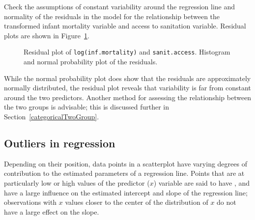 \begin{example}{Check the assumptions of constant variability around the regression line and normality of the residuals in the model for the relationship between the transformed infant mortality variable and access to sanitation variable. Residual plots are shown in Figure~\ref{wdiResid}.
		
\begin{figure}[h]
	\centering
	\caption{ Residual plot of \texttt{log(inf.mortality)} and \texttt{sanit.access}.  Histogram and normal probability plot of the residuals.}
	\label{wdiResid}
\end{figure}		
}		

While the normal probability plot does show that the residuals are approximately normally distributed, the residual plot reveals that variability is far from constant around the two predictors. Another method for assessing the relationship between the two groups is advisable; this is discussed further in Section~\ref{categoricalTwoGroup}.

\label{wdiAssumptionsEx}	

\end{example}


\subsection{Outliers in regression}

Depending on their position, data points in a scatterplot have varying degrees of contribution to the estimated parameters of a regression line. Points that are at particularly low or high values of the predictor ($x$) variable are said to have , and have a large influence on the estimated intercept and slope of the regression line; observations with $x$ values closer to the center of the distribution of $x$ do not have a large effect on the slope. 

